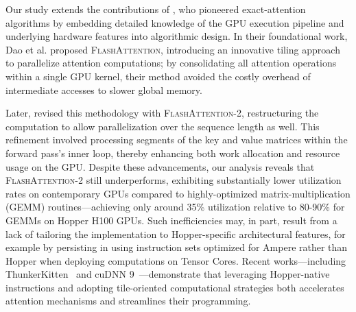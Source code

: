 Our study extends the contributions of \citet{dao2022flashattention}, who pioneered exact-attention algorithms by embedding detailed knowledge of the GPU execution pipeline and underlying hardware features into algorithmic design. In their foundational work, Dao et al. proposed \textsc{FlashAttention}, introducing an innovative tiling approach to parallelize attention computations; by consolidating all attention operations within a single GPU kernel, their method avoided the costly overhead of intermediate accesses to slower global memory.

Later, \citet{dao2023flashattention2} revised this methodology with \textsc{FlashAttention-2}, restructuring the computation to allow parallelization over the sequence length as well. This refinement involved processing segments of the key and value matrices within the forward pass’s inner loop, thereby enhancing both work allocation and resource usage on the GPU. Despite these advancements, our analysis reveals that \textsc{FlashAttention-2} still underperforms, exhibiting substantially lower utilization rates on contemporary GPUs compared to highly-optimized matrix-multiplication (GEMM) routines—achieving only around 35\% utilization relative to 80-90\% for GEMMs on Hopper H100 GPUs. Such inefficiencies may, in part, result from a lack of tailoring the implementation to Hopper-specific architectural features, for example by persisting in using instruction sets optimized for Ampere rather than Hopper when deploying computations on Tensor Cores. Recent works—including ThunkerKitten~\citep{spector2024thunder} and cuDNN 9~\citep{cudnn9}—demonstrate that leveraging Hopper-native instructions and adopting tile-oriented computational strategies both accelerates attention mechanisms and streamlines their programming.

